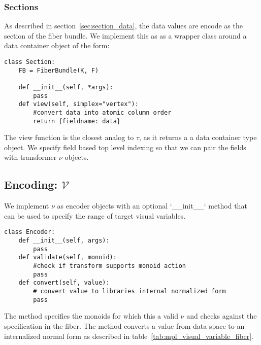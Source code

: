 \documentclass[../main.tex]{subfiles}
\begin{document}
\subsubsection{Sections}
As described in section~\ref{sec:section_data}, the data values are encode as the section of the fiber bundle. We implement this as as a wrapper class around a data container object of the form:
\begin{verbatim}
class Section:
    FB = FiberBundle(K, F)

    def __init__(self, *args):
        pass
    def view(self, simplex="vertex"):
        #convert data into atomic column order 
        return {fieldname: data}
\end{verbatim}

The view function is the closest analog to $\tau$, as it returns a a data container type object. We specify field based top level indexing so that we can pair the fields with transformer $\nu$ objects. 

\subsection{Encoding: $\mathcal{V}$}
We implement $\nu$ as encoder objects with an optional `__init__` method that can be used to specify the range of target visual variables. 

\begin{verbatim}
class Encoder:
    def __init__(self, args):
        pass
    def validate(self, monoid):
        #check if transform supports monoid action
        pass
    def convert(self, value):
        # convert value to libraries internal normalized form
        pass
\end{verbatim}

The  method specifies the monoids for which this a valid $\nu$ and checks against the specification in the fiber. The  method converts a value from data space to an internalized normal form as described in table~\ref{tab:mpl_visual_variable_fiber}.  
\end{document}
